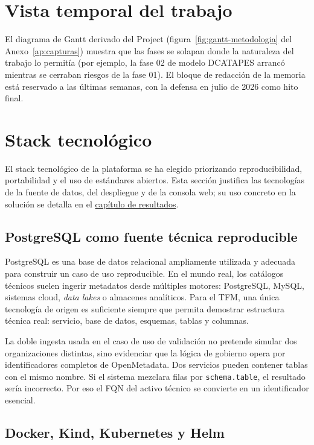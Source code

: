 \section{Vista temporal del trabajo}

El diagrama de Gantt derivado del Project (figura~\ref{fig:gantt-metodologia} del Anexo~\ref{ap:capturas}) muestra que las fases se solapan donde la naturaleza del trabajo lo permitía (por ejemplo, la fase 02 de modelo \ac{DCATAPES} arrancó mientras se cerraban riesgos de la fase 01). El bloque de redacción de la memoria está reservado a las últimas semanas, con la defensa en julio de 2026 como hito final.

\section{Stack tecnológico}\label{sec:stack-tecnologico}

El stack tecnológico de la plataforma se ha elegido priorizando reproducibilidad, portabilidad y el uso de estándares abiertos. Esta sección justifica las tecnologías de la fuente de datos, del despliegue y de la consola web; su uso concreto en la solución se detalla en el \hyperref[cap:resultados]{capítulo de resultados}.

\subsection{PostgreSQL como fuente técnica reproducible}

PostgreSQL es una base de datos relacional ampliamente utilizada y adecuada para construir un caso de uso reproducible. En el mundo real, los catálogos técnicos suelen ingerir metadatos desde múltiples motores: PostgreSQL, MySQL, sistemas cloud, \emph{data lakes} o almacenes analíticos. Para el TFM, una única tecnología de origen es suficiente siempre que permita demostrar estructura técnica real: servicio, base de datos, esquemas, tablas y columnas.

La doble ingesta usada en el caso de uso de validación no pretende simular dos organizaciones distintas, sino evidenciar que la lógica de gobierno opera por identificadores completos de OpenMetadata. Dos servicios pueden contener tablas con el mismo nombre. Si el sistema mezclara filas por \texttt{schema.table}, el resultado sería incorrecto. Por eso el FQN del activo técnico se convierte en un identificador esencial.

\subsection{Docker, Kind, Kubernetes y Helm}

